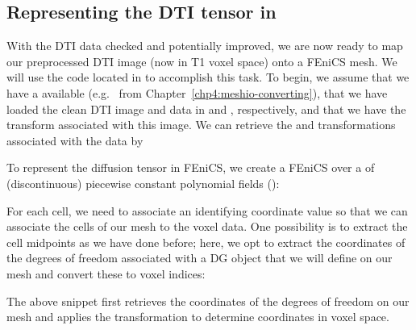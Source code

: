 \subsection{Representing the DTI tensor in \fenics{}}
\label{chp5:sec:loading-dti-tensor}

With the DTI data checked and potentially improved, we are now ready to map 
our preprocessed DTI image (now in T1 voxel space) onto a FEniCS mesh.  We will 
use the code located in  to accomplish this 
task. To begin, we assume that we have a  available (e.g.~%
 from Chapter~\ref{chp4:meshio-converting}), that we have 
loaded the clean DTI image and data in  and , respectively, 
and that we have the  transform associated with this image.  We can retrieve 
the  and  transformations associated with the data 
by 

To represent the diffusion tensor in FEniCS, we create a FEniCS
 over a  of (discontinuous)
piecewise constant polynomial fields (): 

For each cell, we need to associate an identifying coordinate value so
that we can associate the cells of our mesh to the voxel data.  One
possibility is to extract the cell midpoints as we have done before;
here, we opt to extract the coordinates of the degrees of
freedom associated with a DG  object that we will 
define on our mesh and convert these to voxel indices:

\noindent The above snippet first retrieves the coordinates of the
 degrees of freedom on our mesh and applies
the  transformation to determine coordinates in voxel
space.

